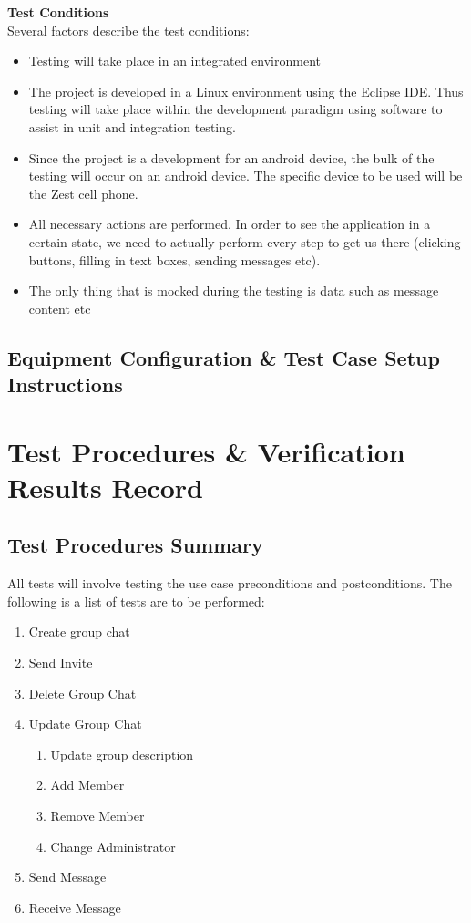 \documentclass[11pt]{article}
\begin{document}
\textbf{Test Conditions}\\
Several factors describe the test conditions:
\begin{itemize}
\item Testing will take place in an integrated environment
\item The project is developed in a Linux environment using the Eclipse IDE. Thus testing will take place within the development paradigm using software to assist in unit and integration testing.
\item Since the project is a development for an android device, the bulk of the testing will occur on an android device. The specific device to be used will be the Zest cell phone.
\item All necessary actions are performed. In order to see the application in a certain state, we need to actually perform every step to get us there (clicking buttons, filling in text boxes, sending messages etc).
\item The only thing that is mocked during the testing is data such as message content etc
\end{itemize}



\subsection{Equipment Configuration \& Test Case Setup Instructions}


\section{Test Procedures \& Verification Results Record}
\subsection{Test Procedures Summary}
All tests will involve testing the use case preconditions and postconditions.
The following is a list of tests are to be performed:
\begin{enumerate}
\item Create group chat
\item Send Invite
\item Delete Group Chat
\item Update Group Chat
\begin{enumerate}
\item Update group description
\item Add Member
\item Remove Member
\item Change Administrator 
\end{enumerate}
\item Send Message
\item Receive Message
\end{enumerate}
\end{document}
